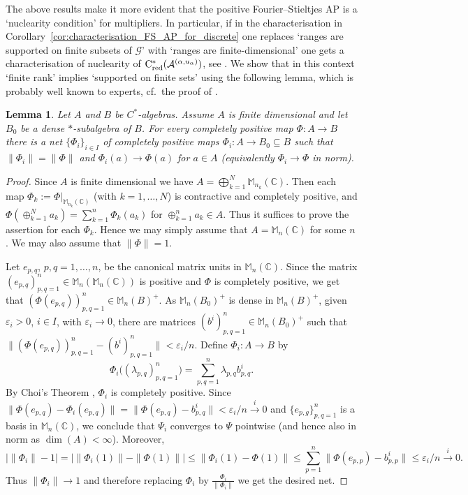 \documentclass[11 pt, leqno]{amsart}
\numberwithin{equation}{section}
\theoremstyle{plain}
\newtheorem {lem} [thm]{Lemma}
\theoremstyle{definition}
\newcommand{\Mat}{\mathbb M} %
\DeclareMathOperator{\red}{red}%
\newcommand{\G}{\mathcal G} %
\newcommand{\A}{\mathcal A}
\newcommand{\C}{\mathbb C}
\newcommand{\cst}{\ifmmode\mathrm{C}^*\else{$\mathrm{C}^*$}\fi}
\begin{document}
The above results make it more evident that the positive Fourier--Stieltjes AP is a `nuclearity condition' for multipliers.
In particular, if in the characterisation in Corollary~\ref{cor:characterisation_FS_AP_for_discrete} one replaces `ranges are supported on finite subsets of $\G$' with `ranges are finite-dimensional' one gets a characterisation of nuclearity of $\cst_{\red}(\A^{(\alpha,u_{\alpha})})$, see \cite[Theorem 3.1]{ChoiEffros}. 
We show that in this context `finite rank' implies `supported on finite sets' using the following lemma, which is probably well known to experts, cf.\ the proof of 
\cite[Theorem 4.3]{mstt}.

\begin{lem}\label{lem:McKee_Skalski_Todorow_Turowska}
Let $A$ and $B$ be $C^*$-algebras. 
Assume $A$ is finite dimensional and let $B_0$ be a dense $*$-subalgebra of $B$. 
For every completely positive map $\Phi : A \to B$ there is a net $\{\Phi_i\}_{i\in I}$ of completely positive maps $\Phi_i : A \to B_0 \subseteq B$ such that $\| \Phi_i \| = \| \Phi \|$ and $\Phi_{i}(a) \to \Phi(a)$ for $a\in A$ (equivalently $\Phi_{i} \to \Phi$ in norm).
\end{lem}
\begin{proof} 
Since $A$ is finite dimensional we have $A = \bigoplus_{k=1}^N \Mat_{n_k}(\C)$. 
Then each map $\Phi_k := \Phi|_{\Mat_{n_k}(\C)}$ (with $k = 1 , \ldots , N$) is contractive and completely positive, and $\Phi(\oplus_{k=1}^N a_k) = \sum_{k=1}^n \Phi_k(a_k)$ for $\oplus_{k=1}^n a_k \in A$. 
Thus it suffices to prove the assertion for each $\Phi_k$. 
Hence we may simply assume that $A=\Mat_{n}(\C)$ for some $n$. 
We may also assume that $\|\Phi\|=1$.

Let $e_{p,q}$, $p , q = 1, \ldots , n$, be the canonical matrix units in $\Mat_{n}(\C)$. 
Since the matrix $(e_{p,q})^n_{p,q=1}\in \Mat_{n}(\Mat_n(\C))$ is positive and $\Phi$ is completely positive, we get that $(\Phi(e_{p,q}))^n_{p,q=1}\in \Mat_{n}(B)^+$. 
As $\Mat_{n}(B_0)^+$ is dense in $\Mat_{n}(B)^+$, given $\varepsilon_i>0$, $i\in I$, with $\varepsilon_i\to 0$, there are matrices $(b^i)_{p,q=1}^n\in \Mat_{n}(B_0)^+$ such that $\| (\Phi(e_{p,q}))^n_{p,q = 1} - (b^i)_{p,q=1}^n \| < \varepsilon_i/n$.
Define $\Phi_i : A \to B$ by 
\[
    \Phi_i \big( (\lambda_{p,q})^n_{p,q=1} \big) = \sum^n_{p,q=1} \lambda_{p,q} b^i_{p,q} .
\] 
By Choi's Theorem \cite[Theorem 3.14]{Paulsen}, $\Phi_i$ is completely positive.  
Since $\| \Phi(e_{p,q}) - \Phi_i(e_{p,q}) \|= \| \Phi(e_{p,q}) - b^i_{p,q}\| < \varepsilon_i/n\stackrel{i}\to 0$ and $\{e_{p,g}\}_{p,q=1}^n$ is a basis in $\Mat_{n}(\C)$, we conclude that $\Psi_i$ converges to $\Psi$ pointwise (and hence also in norm as $\dim(A)<\infty$).
Moreover,
\[
    | \|\Phi_i\|-1| = | \|\Phi_i(1)\| - \|\Phi(1)\| | \leq \| \Phi_i(1) -\Phi(1) \| \leq \sum_{p=1}^n \| \Phi(e_{p,p}) - b^i_{p,p}\|\leq \varepsilon_i/n\stackrel{i}\to 0.
\]
Thus $\|\Phi_i\|\to 1$ and therefore replacing $\Phi_i$ by $\frac{\Phi_i}{\|\Phi_i\|}$ we get the desired net.
\end{proof}
\end{document}
